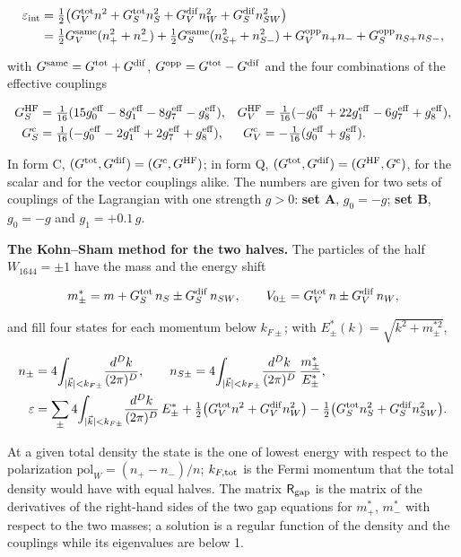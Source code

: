 \documentclass[
  10pt,
]{article}
\begin{document}
\[\begin{aligned}
\varepsilon_{\rm int}&=\tfrac12\big(G_V^{\rm tot}n^2+G_S^{\rm tot}n_S^2+G_V^{\rm dif}n_W^2+G_S^{\rm dif}n_{SW}^2\big)\\
&=\tfrac12G_V^{\rm same}(n_+^2+n_-^2)+\tfrac12G_S^{\rm same}(n_{S+}^2+n_{S-}^2)+G_V^{\rm opp}n_+n_-+G_S^{\rm opp}n_{S+}n_{S-},
\end{aligned}\]

with \(G^{\rm same}=G^{\rm tot}+G^{\rm dif}\),
\(G^{\rm opp}=G^{\rm tot}-G^{\rm dif}\) and the four combinations of the
effective couplings

\[\begin{aligned}
G_S^{\rm HF}&=\tfrac1{16}(15g_0^{\rm eff}-8g_1^{\rm eff}-8g_7^{\rm eff}-g_8^{\rm eff}),&
G_V^{\rm HF}&=\tfrac1{16}(-g_0^{\rm eff}+22g_1^{\rm eff}-6g_7^{\rm eff}+g_8^{\rm eff}),\\
G_S^{\rm c}&=\tfrac1{16}(-g_0^{\rm eff}-2g_1^{\rm eff}+2g_7^{\rm eff}+g_8^{\rm eff}),&
G_V^{\rm c}&=-\tfrac1{16}(g_0^{\rm eff}+g_8^{\rm eff}).
\end{aligned}\]

In form C, \((G^{\rm tot},G^{\rm dif})=(G^{\rm c},G^{\rm HF})\); in form
Q, \((G^{\rm tot},G^{\rm dif})=(G^{\rm HF},G^{\rm c})\), for the scalar
and for the vector couplings alike. The numbers are given for two sets
of couplings of the Lagrangian with one strength \(g>0\): \textbf{set
A}, \(g_0=-g\); \textbf{set B}, \(g_0=-g\) and \(g_1=+0.1\,g\).

\textbf{The Kohn--Sham method for the two halves.} The particles of the
half \(W_{1644}=\pm1\) have the mass and the energy shift

\[m^*_\pm=m+G_S^{\rm tot}\,n_S\pm G_S^{\rm dif}\,n_{SW},\qquad V_{0\pm}=G_V^{\rm tot}\,n\pm G_V^{\rm dif}\,n_W,\]

and fill four states for each momentum below \(k_{F\pm}\); with
\(E^*_\pm(k)=\sqrt{k^2+m^{*2}_\pm}\),

\[\begin{aligned}
n_\pm&=4\!\int_{|\vec k|<k_{F\pm}}\!\frac{d^Dk}{(2\pi)^D},\qquad
n_{S\pm}=4\!\int_{|\vec k|<k_{F\pm}}\!\frac{d^Dk}{(2\pi)^D}\,\frac{m^*_\pm}{E^*_\pm},\\
\varepsilon&=\sum_\pm4\!\int_{|\vec k|<k_{F\pm}}\!\frac{d^Dk}{(2\pi)^D}\,E^*_\pm
+\tfrac12\big(G_V^{\rm tot}n^2+G_V^{\rm dif}n_W^2\big)-\tfrac12\big(G_S^{\rm tot}n_S^2+G_S^{\rm dif}n_{SW}^2\big).
\end{aligned}\]

At a given total density the state is the one of lowest energy with
respect to the polarization \(\mathrm{pol}_W=(n_+-n_-)/n\);
\(k_{F,\rm tot}\) is the Fermi momentum that the total density would
have with equal halves. The matrix \(\mathsf R_{\rm gap}\) is the matrix
of the derivatives of the right-hand sides of the two gap equations for
\(m^*_+\), \(m^*_-\) with respect to the two masses; a solution is a
regular function of the density and the couplings while its eigenvalues
are below 1.
\end{document}
